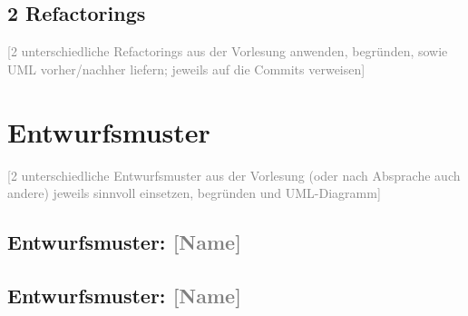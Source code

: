 \documentclass[a4paper,12pt]{article}
\newcommand{\placeholder}[1]{\textcolor{gray}{[#1]}}
\begin{document}
\subsection*{2 Refactorings}

\placeholder{2 unterschiedliche Refactorings aus der Vorlesung anwenden, begründen, sowie UML
    vorher/nachher liefern; jeweils auf die Commits verweisen}

\section{Entwurfsmuster}

\placeholder{2 unterschiedliche Entwurfsmuster aus der Vorlesung (oder nach Absprache auch andere)
    jeweils sinnvoll einsetzen, begründen und UML-Diagramm}

\subsection*{Entwurfsmuster: \placeholder{Name}}

\subsection*{Entwurfsmuster: \placeholder{Name}}
\end{document}
